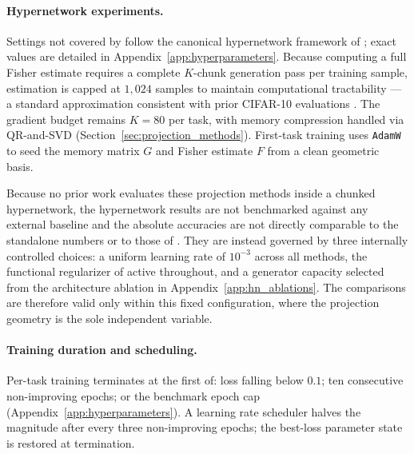 \paragraph{Hypernetwork experiments.}
Settings not covered by \citet{garg_fisher-orthogonal_2026} follow the canonical 
hypernetwork framework of \citet{oswald_continual_2020}; exact values are detailed 
in Appendix~\ref{app:hyperparameters}. Because computing a full Fisher estimate 
requires a complete $K$-chunk generation pass per training sample, estimation is 
capped at $1{,}024$ samples to maintain computational tractability --- a standard 
approximation consistent with prior CIFAR-10 evaluations \citep{kirkpatrick_overcoming_2017}. 
The gradient budget remains $K = 80$ per task, with memory compression handled via 
QR-and-SVD (Section~\ref{sec:projection_methods}). First-task training uses 
\texttt{AdamW} to seed the memory matrix $G$ and Fisher estimate $F$ from a 
clean geometric basis.

Because no prior work evaluates these projection methods inside a chunked
hypernetwork, the hypernetwork results are not benchmarked against any
external baseline and the absolute accuracies are not directly comparable to
the standalone numbers or to those of \citet{garg_fisher-orthogonal_2026}.
They are instead governed by three internally controlled choices: a uniform
learning rate of $10^{-3}$ across all methods, the functional regularizer of
\citet{oswald_continual_2020} active throughout, and a generator capacity
selected from the architecture ablation in Appendix~\ref{app:hn_ablations}.
The comparisons are therefore valid only within this fixed configuration,
where the projection geometry is the sole independent variable.

\paragraph{Training duration and scheduling.}
Per-task training terminates at the first of: loss falling below $0.1$;
ten consecutive non-improving epochs; or the benchmark epoch cap
(Appendix~\ref{app:hyperparameters}).
A learning rate scheduler halves the magnitude after every three
non-improving epochs; the best-loss parameter state is restored at
termination.

